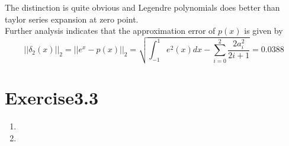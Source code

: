 \documentclass[paper=a4, fontsize=11pt]{scrartcl} %
\numberwithin{equation}{section} %
\numberwithin{figure}{section} %
\numberwithin{table}{section} %
\begin{document}
\begin{enumerate}
		The distinction is quite obvious and Legendre polynomials does better than taylor series expansion at zero point.\\
		Further analysis indicates that the approximation error of $p(x)$ is given by
		\begin{equation}
			||\delta_2(x)||_2 = ||e^x - p(x)||_2 = \sqrt{\int_{-1}^{1} e^2(x) dx - \sum_{i=0}^{2} \frac{2 a_i ^2}{2i + 1}} = 0.0388
		\end{equation}
	
	\end{enumerate}

\section{Exercise3.3}
	\begin{enumerate}
		\item 
		
		\item 
		
	\end{enumerate}
\end{document}

